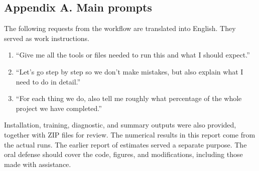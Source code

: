 \documentclass[10pt,a4paper,twocolumn]{extarticle}
\begin{document}
\newpage
\subsection*{Appendix A. Main prompts}
{\small The following requests from the workflow are translated into English. They served as work instructions.
\begin{enumerate}
\setlength{\itemsep}{2pt}
\setlength{\parskip}{0pt}
\item “Give me all the tools or files needed to run this and what I should expect.”
\item “Let's go step by step so we don't make mistakes, but also explain what I need to do in detail.”
\item “For each thing we do, also tell me roughly what percentage of the whole project we have completed.”
\end{enumerate}
Installation, training, diagnostic, and summary outputs were also provided, together with ZIP files for review. The numerical results in this report come from the actual runs. The earlier report of estimates served a separate purpose. The oral defense should cover the code, figures, and modifications, including those made with assistance.
\par}

\end{document}
